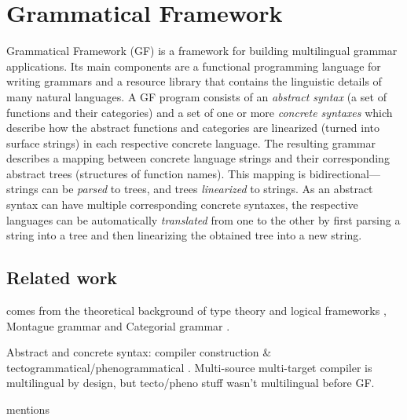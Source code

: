 \section{Grammatical Framework}
\label{sec:gf-intro}

Grammatical Framework (GF) \cite{ranta2011gfbook} 
is a framework for building multilingual grammar applications. Its main
components are a functional programming language for writing grammars
and a resource library that contains the linguistic details of many
natural languages.
A GF program consists of an \emph{abstract syntax} (a set of functions
and their categories) and a set of one or more
\emph{concrete syntaxes} which describe how the abstract
functions and categories are linearized (turned into surface strings) in each
respective concrete language. The resulting grammar
describes a mapping between concrete language strings and
their corresponding abstract trees (structures of function names).
This mapping is bidirectional---strings can be \emph{parsed} to
trees, and trees \emph{linearized} to strings.
As an abstract syntax can have multiple corresponding concrete syntaxes,
the respective languages can be automatically \emph{translated} from one to the other by
first parsing a string into a tree and then linearizing the obtained tree
into a new string.

\subsection{Related work}

\gf{} comes from the theoretical background of type theory and logical
frameworks , Montague grammar \cite{montague} and
Categorial grammar \cite{catgram}.




Abstract and concrete syntax: compiler construction \& tectogrammatical/phenogrammatical . Multi-source multi-target compiler is multilingual by design, but tecto/pheno stuff wasn't multilingual before GF.

\cite{ranta2011gfbook} mentions 






